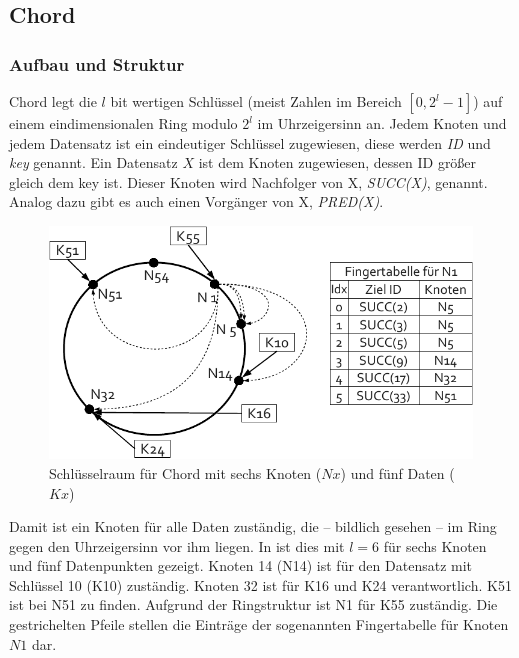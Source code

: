 \subsection{Chord}
\label{chap:evaluation_chord}

\subsubsection{Aufbau und Struktur}
Chord \cite{Stoica2003} legt die $l$ bit wertigen Schlüssel (meist Zahlen im Bereich $[0,2^l-1]$) auf einem eindimensionalen Ring modulo $2^l$ im Uhrzeigersinn an. Jedem Knoten und jedem Datensatz ist ein eindeutiger Schlüssel zugewiesen, diese werden \emph{ID} und \emph{key} genannt. Ein Datensatz $X$ ist dem Knoten zugewiesen, dessen ID größer gleich dem key ist. Dieser Knoten wird Nachfolger von X, \emph{SUCC(X)}, genannt. Analog dazu gibt es auch einen Vorgänger von X, \emph{PRED(X)}.

\begin{figure}[htbp]
\centering
\includegraphics{grafics/chord_key_space.pdf}
\caption{Schlüsselraum für Chord mit sechs Knoten ($Nx$) und fünf Daten ($Kx$)}
\label{fig:chord_key_space}
\end{figure}

Damit ist ein Knoten für alle Daten zuständig, die -- bildlich gesehen -- im Ring gegen den Uhrzeigersinn vor ihm liegen. In  ist dies mit $l=6$ für sechs Knoten und fünf Datenpunkten gezeigt. Knoten 14 (N14) ist für den Datensatz mit Schlüssel 10 (K10) zuständig. Knoten 32 ist für K16 und K24 verantwortlich. K51 ist bei N51 zu finden. Aufgrund der Ringstruktur ist N1 für K55 zuständig. Die gestrichelten Pfeile stellen die Einträge der sogenannten Fingertabelle für Knoten $N1$ dar. 

